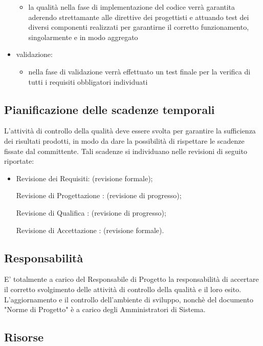 \begin{itemize}
			\begin{itemize}
				\item la qualità nella fase di implementazione del codice verrà garantita aderendo strettamante alle direttive dei progettisti e attuando test dei diversi componenti realizzati per garantirne il corretto funzionamento, singolarmente e in modo aggregato
			\end{itemize}
		\item validazione:
			\begin{itemize}
				\item nella fase di validazione verrà effettuato un test finale per la verifica di tutti i requisiti obbligatori individuati
			\end{itemize}
	\end{itemize}
	\subsection{Pianificazione delle scadenze temporali}
	L'attività di controllo della qualità deve essere svolta per garantire la sufficienza dei risultati prodotti, in modo da dare la possibilità di rispettare le scadenze fissate dal committente.
	Tali scadenze si individuano nelle revisioni di seguito riportate:
		\begin{itemize}
			\item Revisione dei Requisiti:  (revisione formale);
			\item[Revisione di Progettazione]: (revisione di progresso);
			\item[Revisione di Qualifica]: (revisione di progresso);
			\item[Revisione di Accettazione]: (revisione formale).
		\end{itemize}
	
	\subsection{Responsabilità}
	E' totalmente a carico del Responsabile di Progetto la responsabilità di accertare il corretto svolgimento delle attività di controllo della qualità e il loro esito.
	L'aggiornamento e il controllo dell'ambiente di sviluppo, nonchè del documento "Norme di Progetto" è a carico degli Amministratori di Sistema.
	\subsection{Risorse}
